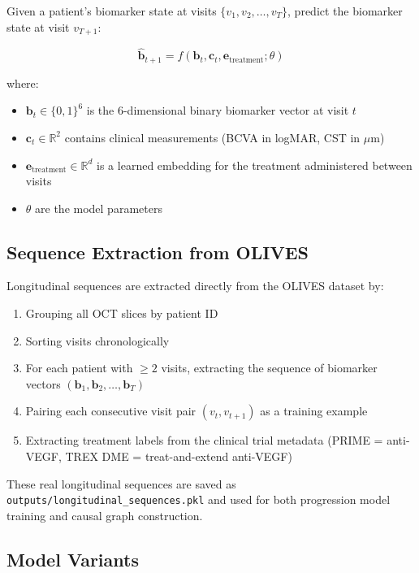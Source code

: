 \documentclass[12pt,a4paper]{article}
\begin{document}
Given a patient's biomarker state at visits $\{v_1, v_2, \ldots, v_T\}$, predict the biomarker state at visit $v_{T+1}$:

\begin{equation}
\hat{\mathbf{b}}_{t+1} = f(\mathbf{b}_t, \mathbf{c}_t, \mathbf{e}_{\text{treatment}}; \theta)
\end{equation}

where:
\begin{itemize}[nosep]
  \item $\mathbf{b}_t \in \{0,1\}^6$ is the 6-dimensional binary biomarker vector at visit $t$
  \item $\mathbf{c}_t \in \mathbb{R}^2$ contains clinical measurements (BCVA in logMAR, CST in $\mu$m)
  \item $\mathbf{e}_{\text{treatment}} \in \mathbb{R}^d$ is a learned embedding for the treatment administered between visits
  \item $\theta$ are the model parameters
\end{itemize}

\subsection{Sequence Extraction from OLIVES}

Longitudinal sequences are extracted directly from the OLIVES dataset by:
\begin{enumerate}[nosep]
  \item Grouping all OCT slices by patient ID
  \item Sorting visits chronologically
  \item For each patient with $\geq 2$ visits, extracting the sequence of biomarker vectors $(\mathbf{b}_1, \mathbf{b}_2, \ldots, \mathbf{b}_T)$
  \item Pairing each consecutive visit pair $(v_t, v_{t+1})$ as a training example
  \item Extracting treatment labels from the clinical trial metadata (PRIME = anti-VEGF, TREX DME = treat-and-extend anti-VEGF)
\end{enumerate}

These real longitudinal sequences are saved as \texttt{outputs/longitudinal\_sequences.pkl} and used for both progression model training and causal graph construction.

\subsection{Model Variants}
\end{document}
